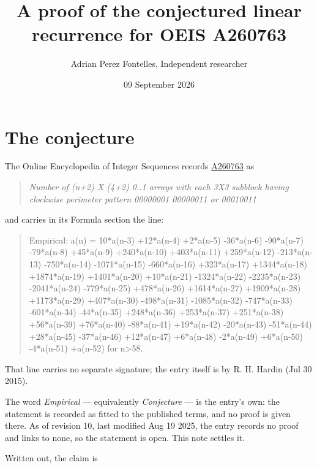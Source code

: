 \documentclass[11pt]{article}
\title{A proof of the conjectured linear recurrence for OEIS A260763}
\author{Adrian Perez Fontelles, Independent researcher}
\date{09 September 2026}
\theoremstyle{definition}
\begin{document}
\maketitle
\section{The conjecture}

The Online Encyclopedia of Integer Sequences records \href{https://oeis.org/A260763}{A260763} as

\begin{quote}\itshape Number of (n+2) X (4+2) 0..1 arrays with each 3X3 subblock having clockwise perimeter pattern 00000001 00000011 or 00010011\end{quote}

and carries in its Formula section the line:

\begin{quote}\ttfamily Empirical: a(n) = 10*a(n-3) +12*a(n-4) +2*a(n-5) -36*a(n-6) -90*a(n-7) -79*a(n-8) +45*a(n-9) +240*a(n-10) +403*a(n-11) +259*a(n-12) -213*a(n-13) -750*a(n-14) -1071*a(n-15) -660*a(n-16) +323*a(n-17) +1344*a(n-18) +1874*a(n-19) +1401*a(n-20) +10*a(n-21) -1324*a(n-22) -2235*a(n-23) -2041*a(n-24) -779*a(n-25) +478*a(n-26) +1614*a(n-27) +1909*a(n-28) +1173*a(n-29) +407*a(n-30) -498*a(n-31) -1085*a(n-32) -747*a(n-33) -601*a(n-34) -44*a(n-35) +248*a(n-36) +253*a(n-37) +251*a(n-38) +56*a(n-39) +76*a(n-40) -88*a(n-41) +19*a(n-42) -20*a(n-43) -51*a(n-44) +28*a(n-45) -37*a(n-46) +12*a(n-47) +6*a(n-48) -2*a(n-49) +6*a(n-50) -4*a(n-51) +a(n-52) for n>58.\end{quote}

That line carries no separate signature; the entry itself is by R. H. Hardin (Jul 30 2015).

The word {\itshape Empirical} --- equivalently {\itshape Conjecture} --- is the entry's own: the statement is recorded as fitted to the published terms, and no proof is given there. As of revision 10, last modified Aug 19 2025, the entry records no proof and links to none, so the statement is open. This note settles it.

Written out, the claim is
\end{document}
